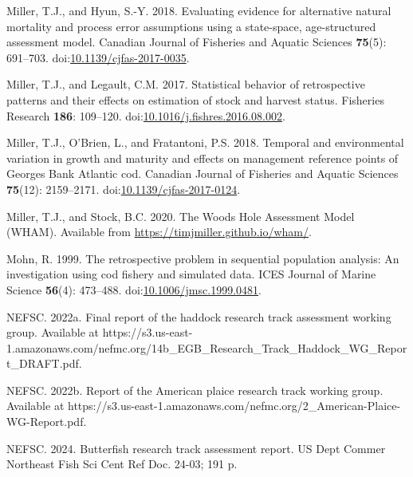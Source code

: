 \documentclass[
  12pt,
]{article}
\newlength{\cslhangindent}
\newlength{\cslentryspacingunit} %
\newenvironment{CSLReferences}[2] %
 {%
  \setlength{\parindent}{0pt}
  \ifodd #1
  \let\oldpar\par
  \def\par{\hangindent=\cslhangindent\oldpar}
  \fi
  \setlength{\parskip}{#2\cslentryspacingunit}
 }%
 {}
\begin{document}
\begin{CSLReferences}{1}{0}
\leavevmode{}%
Miller, T.J., and Hyun, S.-Y. 2018. Evaluating evidence for alternative
natural mortality and process error assumptions using a state-space,
age-structured assessment model. Canadian Journal of Fisheries and
Aquatic Sciences \textbf{75}(5): 691--703.
doi:\href{https://doi.org/10.1139/cjfas-2017-0035}{10.1139/cjfas-2017-0035}.

\leavevmode{}%
Miller, T.J., and Legault, C.M. 2017. Statistical behavior of
retrospective patterns and their effects on estimation of stock and
harvest status. Fisheries Research \textbf{186}: 109--120.
doi:\href{https://doi.org/10.1016/j.fishres.2016.08.002}{10.1016/j.fishres.2016.08.002}.

\leavevmode{}%
Miller, T.J., O'Brien, L., and Fratantoni, P.S. 2018. Temporal and
environmental variation in growth and maturity and effects on management
reference points of {G}eorges {B}ank {A}tlantic cod. Canadian Journal of
Fisheries and Aquatic Sciences \textbf{75}(12): 2159--2171.
doi:\href{https://doi.org/10.1139/cjfas-2017-0124}{10.1139/cjfas-2017-0124}.

\leavevmode{}%
Miller, T.J., and Stock, B.C. 2020. The {Woods Hole Assessment Model}
({WHAM}). Available from \url{https://timjmiller.github.io/wham/}.

\leavevmode{}%
Mohn, R. 1999. The retrospective problem in sequential population
analysis: An investigation using cod fishery and simulated data. ICES
Journal of Marine Science \textbf{56}(4): 473--488.
doi:\href{https://doi.org/10.1006/jmsc.1999.0481}{10.1006/jmsc.1999.0481}.

\leavevmode{}%
NEFSC. 2022a. Final report of the haddock research track assessment
working group. {Available} at
https://s3.us-east-1.amazonaws.com/nefmc.org/14b\_EGB\_Research\_Track\_Haddock\_WG\_Report\_DRAFT.pdf.

\leavevmode{}%
NEFSC. 2022b. Report of the {A}merican plaice research track working
group. {Available} at
https://s3.us-east-1.amazonaws.com/nefmc.org/2\_American-Plaice-WG-Report.pdf.

\leavevmode{}%
NEFSC. 2024. Butterfish research track assessment report. US Dept Commer
Northeast Fish Sci Cent Ref Doc. 24-03; 191 p.


\end{CSLReferences}
\end{document}
